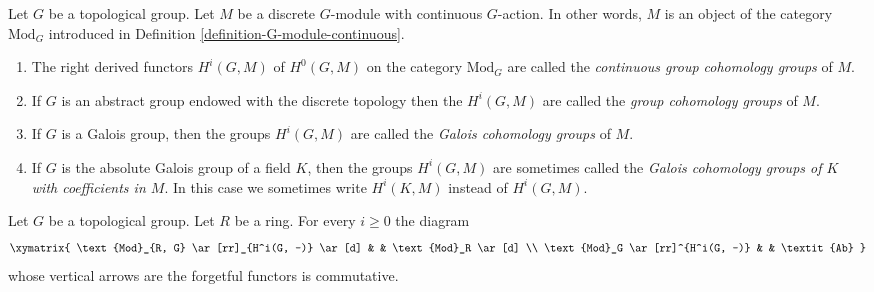 \begin{definition}
\label{definition-galois-cohomology}
Let $G$ be a topological group. Let $M$ be a discrete $G$-module
with continuous $G$-action. In other words, $M$ is an object
of the category $\text{Mod}_G$ introduced in
Definition \ref{definition-G-module-continuous}.
\begin{enumerate}
\item The right derived functors $H^i(G, M)$ of $H^0(G, M)$ on the
category $\text{Mod}_G$ are called the
{\it continuous group cohomology groups} of $M$.
\item If $G$ is an abstract group endowed with the discrete topology
then the $H^i(G, M)$ are called the {\it group cohomology groups} of $M$.
\item If $G$ is a Galois group, then the groups $H^i(G, M)$ are called
the {\it Galois cohomology groups} of $M$.
\item If $G$ is the absolute Galois group of a field $K$, then the groups
$H^i(G, M)$ are sometimes called the {\it Galois cohomology groups of $K$
with coefficients in $M$}. In this case we sometimes write
$H^i(K, M)$ instead of $H^i(G, M)$.
\end{enumerate}
\end{definition}

\begin{lemma}
\label{lemma-modules-abelian}
Let $G$ be a topological group. Let $R$ be a ring.
For every $i \geq 0$ the diagram
$$
\xymatrix{
\text{Mod}_{R, G} \ar[rr]_{H^i(G, -)} \ar[d] & &
\text{Mod}_R \ar[d] \\
\text{Mod}_G \ar[rr]^{H^i(G, -)} & &
\textit{Ab}
}
$$
whose vertical arrows are the forgetful functors is commutative.
\end{lemma}

